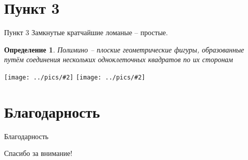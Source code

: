 \documentclass[serif, ucs]{beamer}
\newtheorem{Def}{Определение}[section]
\newcommand{\gr}[2]{\texttt{[image: ../pics/\#2]}}
\begin{document}
\section{Пункт 3}
\begin{frame}{Пункт 3}
	Замкнутые кратчайшие ломаные -- простые.
	
	\begin{Def}
	Полимино -- плоские геометрические фигуры, образованные путём соединения нескольких одноклеточных квадратов по их сторонам
\end{Def}

\gr{0.4}{babaBaBAAA}
\gr{0.4}{bbbaBBaBAA}
\end{frame}
\section{Благодарность}
\begin{frame}{Благодарность}
\begin{center}
{\LARGE Спасибо за внимание!}
\end{center}
\end{frame}
\end{document}
